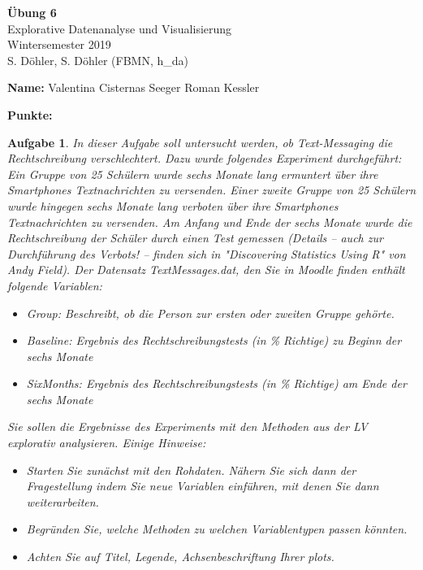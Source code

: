 \documentclass[]{article}
\title{}
\author{}
\date{}
\begin{document}
\theoremstyle{break}
\newtheorem{auf}{Aufgabe}

\newcommand{\R}{{\sffamily R} }

\begin{centering}
\Huge
{\bf Übung 6}\\
\Large
Explorative Datenanalyse und Visualisierung\\
\normalsize
Wintersemester 2019\\
S. Döhler, S. Döhler (FBMN, h\_da)\\
\end{centering}

\hrulefill

\textbf{Name:} Valentina Cisternas Seeger Roman Kessler

\textbf{Punkte:}

\hrulefill

\setcounter{auf}{15}
\begin{auf}
In dieser Aufgabe soll untersucht werden, ob Text-Messaging die Rechtschreibung verschlechtert. Dazu wurde folgendes Experiment durchgeführt: Ein Gruppe von 25 Schülern wurde sechs Monate lang ermuntert über ihre Smartphones Textnachrichten zu versenden. Einer zweite Gruppe von 25 Schülern wurde hingegen sechs Monate lang verboten über ihre Smartphones Textnachrichten zu versenden. Am Anfang und Ende der sechs Monate wurde die Rechtschreibung der Schüler durch einen Test gemessen (Details -- auch zur Durchführung des Verbots! -- finden sich in "Discovering Statistics Using R" von Andy Field). Der Datensatz {\ttfamily TextMessages.dat}, den Sie in Moodle finden enthält folgende Variablen:
\begin{itemize}
    \item {\ttfamily Group}: Beschreibt, ob die Person zur ersten oder zweiten Gruppe gehörte.
    \item {\ttfamily Baseline:} Ergebnis des Rechtschreibungstests (in \% Richtige) zu Beginn der sechs Monate
    \item {\ttfamily SixMonths:} Ergebnis des Rechtschreibungstests (in \% Richtige) am Ende der sechs Monate
\end{itemize}
Sie sollen die Ergebnisse des Experiments mit den Methoden aus der LV explorativ analysieren. Einige Hinweise:
\begin{itemize}
    \item Starten Sie zunächst mit den Rohdaten. Nähern Sie sich dann der Fragestellung indem Sie neue Variablen einführen, mit denen Sie dann weiterarbeiten.
    \item Begründen Sie, welche Methoden zu welchen Variablentypen passen könnten. 
    \item Achten Sie auf Titel, Legende, Achsenbeschriftung Ihrer plots.
\end{itemize}
\end{auf}
\end{document}
